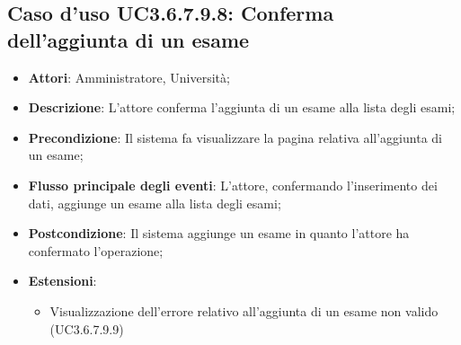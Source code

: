 \subsection{Caso d'uso \texorpdfstring{UC3.6.7.9.8}{UC3.6.7.9.8}: Conferma dell’aggiunta di un esame}
\begin{itemize}
\item \textbf{Attori}: Amministratore, Università;
\item \textbf{Descrizione}: L'attore conferma l'aggiunta di un esame alla lista degli esami;

\item \textbf{Precondizione}: Il sistema fa visualizzare la pagina relativa all'aggiunta di un esame;

\item \textbf{Flusso principale degli eventi}: L'attore, confermando l'inserimento dei dati, aggiunge un esame alla lista degli esami;

\item \textbf{Postcondizione}: Il sistema aggiunge un esame in quanto l'attore ha confermato l'operazione;

\item \textbf{Estensioni}:
\begin{itemize}
\item Visualizzazione dell'errore relativo all’aggiunta di un esame non valido (UC3.6.7.9.9)
\end{itemize}
\end{itemize}
